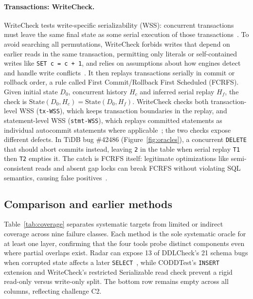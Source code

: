 \paragraph{Transactions: WriteCheck.} WriteCheck tests write-specific serializability (WSS): concurrent transactions must leave the same final state as some serial execution of those transactions~\cite{writecheck}. To avoid searching all permutations, WriteCheck forbids writes that depend on earlier reads in the same transaction, permitting only literals or self-contained writes like \texttt{SET c = c + 1}, and relies on assumptions about how engines detect and handle write conflicts~\cite[Sec.~4]{writecheck}. It then replays transactions serially in commit or rollback order, a rule called First Commit/Rollback First Scheduled (FCRFS). Given initial state $D_0$, concurrent history $H_c$ and inferred serial replay $H_f$, the check is $\mathrm{State}(D_0,H_c)=\mathrm{State}(D_0,H_f)$. WriteCheck checks both transaction-level WSS (\texttt{tx-WSS}), which keeps transaction boundaries in the replay, and statement-level WSS (\texttt{stmt-WSS}), which replays committed statements as individual autocommit statements where applicable~\cite[Secs.~2, 5.4]{writecheck}; the two checks expose different defects. In TiDB bug \#42486 (Figure~\ref{fig:oracles}), a concurrent \texttt{DELETE} that should abort commits instead, leaving \texttt{2} in the table when serial replay \texttt{T1} then \texttt{T2} empties it. The catch is FCRFS itself: legitimate optimizations like semi-consistent reads and absent gap locks can break FCRFS without violating SQL semantics, causing false positives~\cite[Sec.~6.4]{writecheck}.

\subsection{Comparison and earlier methods}\label{sec:compare}
Table~\ref{tab:coverage} separates systematic targets from limited or indirect coverage across nine failure classes. Each method is the sole systematic oracle for at least one layer, confirming that the four tools probe distinct components even where partial overlaps exist. Radar can expose 13 of DDLCheck's 21 schema bugs when corrupted state affects a later \texttt{SELECT}~\cite[Table~4]{ddlcheck}, while CODDTest's \texttt{INSERT} extension and WriteCheck's restricted Serializable read check prevent a rigid read-only versus write-only split. The bottom row remains empty across all columns, reflecting challenge C2.

